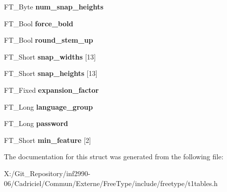 \begin{DoxyCompactItemize}
\item 
\hypertarget{struct_p_s___private_rec___a53f7cfd204400a00eb7203b67d6a1b1c}{F\-T\-\_\-\-Byte {\bfseries num\-\_\-snap\-\_\-heights}}\label{struct_p_s___private_rec___a53f7cfd204400a00eb7203b67d6a1b1c}

\item 
\hypertarget{struct_p_s___private_rec___a40e62a278e48f47a0f204bd9fa5c883f}{F\-T\-\_\-\-Bool {\bfseries force\-\_\-bold}}\label{struct_p_s___private_rec___a40e62a278e48f47a0f204bd9fa5c883f}

\item 
\hypertarget{struct_p_s___private_rec___a96b9729811d02146a87ffdc5c254bbe9}{F\-T\-\_\-\-Bool {\bfseries round\-\_\-stem\-\_\-up}}\label{struct_p_s___private_rec___a96b9729811d02146a87ffdc5c254bbe9}

\item 
\hypertarget{struct_p_s___private_rec___a39cf1a4b21280bf8082ccba0f4824a8a}{F\-T\-\_\-\-Short {\bfseries snap\-\_\-widths} \mbox{[}13\mbox{]}}\label{struct_p_s___private_rec___a39cf1a4b21280bf8082ccba0f4824a8a}

\item 
\hypertarget{struct_p_s___private_rec___a3583caf0cc05de2afac098574ed0bc4b}{F\-T\-\_\-\-Short {\bfseries snap\-\_\-heights} \mbox{[}13\mbox{]}}\label{struct_p_s___private_rec___a3583caf0cc05de2afac098574ed0bc4b}

\item 
\hypertarget{struct_p_s___private_rec___a45cf6e07c4c26f029e66998e6cad9fa0}{F\-T\-\_\-\-Fixed {\bfseries expansion\-\_\-factor}}\label{struct_p_s___private_rec___a45cf6e07c4c26f029e66998e6cad9fa0}

\item 
\hypertarget{struct_p_s___private_rec___afc2a7f950a174577ebfc062bb1598f5c}{F\-T\-\_\-\-Long {\bfseries language\-\_\-group}}\label{struct_p_s___private_rec___afc2a7f950a174577ebfc062bb1598f5c}

\item 
\hypertarget{struct_p_s___private_rec___a309a871cdeb6f658d8fbff23fa13b667}{F\-T\-\_\-\-Long {\bfseries password}}\label{struct_p_s___private_rec___a309a871cdeb6f658d8fbff23fa13b667}

\item 
\hypertarget{struct_p_s___private_rec___af8c829e03c424b1f12b2c9cd4041a868}{F\-T\-\_\-\-Short {\bfseries min\-\_\-feature} \mbox{[}2\mbox{]}}\label{struct_p_s___private_rec___af8c829e03c424b1f12b2c9cd4041a868}

\end{DoxyCompactItemize}


The documentation for this struct was generated from the following file\-:\begin{DoxyCompactItemize}
\item 
X\-:/\-Git\-\_\-\-Repository/inf2990-\/06/\-Cadriciel/\-Commun/\-Externe/\-Free\-Type/include/freetype/t1tables.\-h\end{DoxyCompactItemize}
